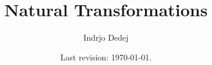 




\title{Natural Transformations}
\author{Indrjo Dedej}
\date{Last revision: \today{}.}



\maketitle

\tableofcontents

%






